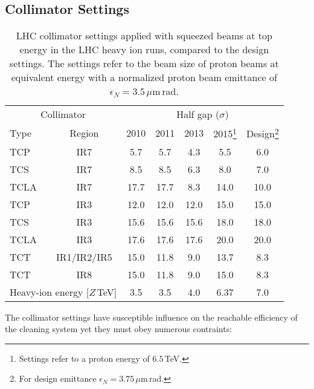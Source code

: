 \subsection{Collimator Settings}
%
\begin{table}[t]
\caption{LHC collimator settings applied with squeezed beams at top energy in the LHC heavy ion runs, compared to the design settings. The settings refer to the beam size of proton beams at equivalent energy with a normalized proton beam emittance of $\epsilon_N = 3.5\,\mu$m$\,$rad. }
%
\begin{center}
\begin{minipage}{10cm}
\begin{tabular}{lcccccc}
\toprule
\midrule
 \multicolumn{2}{c}{Collimator} & \multicolumn{5}{c}{Half gap ($\sigma$)} \\
Type & Region & 2010 & 2011 & 2013 & 2015\footnote{Settings refer to a proton energy of $6.5\,$TeV.} & Design\footnote{For design emittance $\epsilon_N=3.75\,\mu$m$\,$rad.} \\ \midrule
TCP  & IR7 & 5.7  & 5.7  & 4.3     & 5.5  & 6.0  \\
TCS  & IR7 & 8.5  & 8.5  & 6.3     & 8.0  & 7.0  \\
TCLA & IR7 & 17.7 & 17.7 & 8.3     & 14.0 & 10.0 \\ \midrule
TCP  & IR3 & 12.0 & 12.0 & 12.0    & 15.0 & 15.0 \\
TCS  & IR3 & 15.6 & 15.6 & 15.6    & 18.0 & 18.0 \\
TCLA & IR3 & 17.6 & 17.6 & 17.6    & 20.0 & 20.0 \\ \midrule
TCT  & IR1/IR2/IR5        & 15.0 & 11.8 &  9.0 & 13.7& 8.3  \\         
TCT  & IR8                & 15.0 & 11.8 &  9.0 & 15.0& 8.3  \\ \midrule \midrule
\multicolumn{2}{c}{Heavy-ion energy [$Z\,$TeV]} & 3.5 & 3.5 & 4.0 & 6.37& 7.0 \\
\bottomrule
\end{tabular}
\end{minipage}
\end{center}
\label{tab:14070901}
\end{table}
%
The collimator settings have susceptible influence on the reachable efficiency of the cleaning system yet they must obey numerous contraints:
